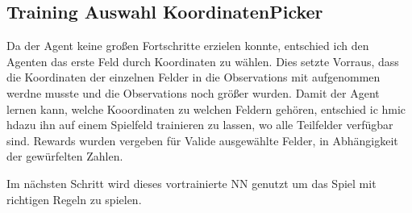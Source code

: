 \subsection{Training Auswahl KoordinatenPicker}
Da der Agent keine großen Fortschritte erzielen konnte, entschied ich den Agenten das erste Feld durch Koordinaten zu wählen.
Dies setzte Vorraus, dass die Koordinaten der einzelnen Felder in die Observations mit aufgenommen werdne musste und die Observations noch größer wurden.
Damit der Agent lernen kann, welche Kooordinaten zu welchen Feldern gehören, entschied ic hmic hdazu ihn auf einem Spielfeld trainieren zu lassen, wo alle Teilfelder verfügbar sind.
Rewards wurden vergeben für Valide ausgewählte Felder, in Abhängigkeit der gewürfelten Zahlen.

Im nächsten Schritt wird dieses vortrainierte NN genutzt um das Spiel mit richtigen Regeln zu spielen.
